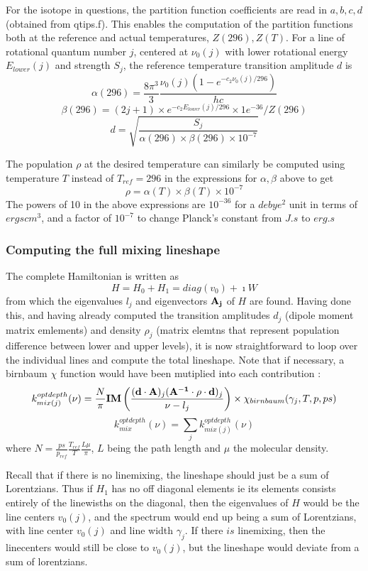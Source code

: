 \documentclass[11pt]{article}
\begin{document}
For the isotope in questions, the partition function coefficients are
read in $a,b,c,d$ (obtained from qtips.f). This enables the computation of 
the partition functions both at the reference and actual temperatures,
$Z(296), Z(T)$. For a line of rotational quantum number $j$, centered 
at $\nu_{0}(j)$ with lower rotational energy $E_{lower}(j)$ and strength 
$S_{j}$, the reference temperature transition amplitude $d$ is
\[
\alpha(296) = \frac{8 \pi^{3}}{3} 
              \frac{\nu_{0}(j) (1-e^{-c_{2}\nu_{0}(j)/296})}{hc}
\]
\[
\beta(296) = (2j+1) \times e^{-c_{2} E_{lower}(j)/296} 
                     \times 1e^{-36}/Z(296)
\]
\[
d = \sqrt {\frac{S_{j}}
                    {\alpha(296) \times \beta(296) \times 10^{-7}}}
\]


The population $\rho$ at the desired temperature can similarly be computed 
using temperature $T$ instead of $T_{ref}=296$ in the expressions for
$\alpha,\beta$ above to get
\[
\rho = \alpha(T) \times \beta(T) \times 10^{-7}
\]
The powers of 10 in the above expressions are $10^{-36}$ for a $debye^{2}$ unit
in terms of $ergs cm^{3}$, and a factor of $10^{-7}$ to change
Planck's constant from $J.s$ to $erg.s$

\subsubsection{Computing the full mixing lineshape}
The complete Hamiltonian is written as
\[
H = H_{0} + H_{1} = diag(v_{0}) + \imath W
\]
from which the eigenvalues ${l_{j}}$ and eigenvectors ${\bf A_{j}}$ of $H$ 
are found. Having done this, and having already computed the transition
amplitudes $d_{j}$ (dipole moment matrix emlements) and density $\rho_{j}$
(matrix elemtns that represent population difference between lower and 
upper levels), it is now straightforward to loop over the individual lines
and compute the total lineshape. Note that if necessary, a birnbaum $\chi$
function would have been mutiplied into each contribution : 
\[
k_{mix(j)}^{opt depth}(\nu)=\frac{N}{\pi} {\bf IM} \left( \frac{({\bf d
\cdot
    A})_{j} ({\bf A^{-1}\cdot\rho\cdot d})_{j}}{\nu - l_{j}}\right)
    \times \chi_{birnbaum}(\gamma_{j},T,p,ps)
\]
\[
k_{mix}^{opt depth}(\nu) = \sum_{j} k_{mix(j)}^{opt depth}(\nu)
\]
where $N = \frac{ps}{p_{ref}} \frac{T_{ref}}{T} \frac{L\mu}{\pi}$, $L$ 
being the path length and $\mu$ the molecular density. 

Recall that if there is no linemixing, the lineshape should just be a sum
of Lorentzians. Thus if $H_{1}$ has no off diagonal elements ie its elements
consists entirely of the linewisths on the diagonal, then the eigenvalues of
$H$ would be the line centers $v_{0}(j)$, and the spectrum would end up 
being a sum of Lorentzians, with line center $v_{0}(j)$ and line width
$\gamma_{j}$. If there $is$ linemixing, then the linecenters would still
be close to $v_{0}(j)$, but the lineshape would deviate from a sum of 
lorentzians.
\end{document}
